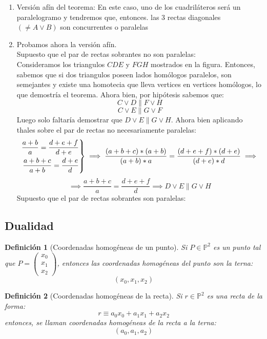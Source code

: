 \documentclass[11pt, a4paper]{article}
\makeatletter
\newif\IfInSansMode
\let\oldsf\sffamily
\renewcommand*{\sffamily}{\oldsf\mathversion{sans}\InSansModetrue}
\let\oldnorm\normalfont
\renewcommand*{\normalfont}{\oldnorm\InSansModefalse\mathversion{normal}}
\renewenvironment{proof}[1][\proofname] {\vspace{-15pt}\par\pushQED{\qed}\normalfont\topsep6\p@\@plus6\p@\relax\trivlist\item[\hskip\labelsep\it#1\@addpunct{.}]\ignorespaces}{\popQED\endtrivlist\@endpefalse}
\renewenvironment{proof}[1][\proofname] {\par\pushQED{\qed}\normalfont\topsep6\p@\@plus6\p@\relax\trivlist\item[\hskip\labelsep\itshape\sffamily#1\@addpunct{.}]\ignorespaces}{\popQED\endtrivlist\@endpefalse}
\theoremstyle{theorem-style}
\theoremstyle{definition-style}
\newtheorem{ndef}{Definición}[section]
\theoremstyle{remark-style}
\theoremstyle{example-style}
\newenvironment{nlist}
{\begin{enumerate}
    \renewcommand\labelenumi{(\emph{\roman{enumi})}}}
  {\end{enumerate}}
\newenvironment{rcases}
{\left.\begin{aligned}}
    {\end{aligned}\right\rbrace}
\makeatother
\begin{document}
\begin{proof} \hfill
	\begin{nlist}
	\item Versión afín del teorema: En este caso, uno de los cuadriláteros será un paralelogramo y tendremos que, entonces. las 3 rectas diagonales $(\ne A\vee B)$ son concurrentes o paralelas
	\item Probamos ahora la versión afín.\\
	Supuesto que el par de rectas sobrantes no son paralelas:\\
	Consideramos los triangulos $CDE$ y $FGH$ mostrados en la figura. Entonces, sabemos que si dos triangulos poseen lados homólogos paralelos, son semejantes y existe una homotecia que lleva vertices en vertices homólogos, lo que demostría el teorema.
	Ahora bien, por hipótesis sabemos que:
	$$C \vee D \parallel F \vee H$$
	$$C \vee E \parallel G \vee F$$
	Luego solo faltaría demostrar que $D \vee E \parallel G \vee H$. Ahora bien aplicando thales sobre el par de rectas no necesariamente paralelas:
	\[
	\begin{rcases}
		\frac{a+b}{a} = \frac{d+e+f}{d+e}\\
		\frac{a+b+c}{a+b} = \frac{d+e}{d}	
\end{rcases} \implies \frac{(a+b+c)*(a+b)}{(a+b)*a} = \frac{(d+e+f)*(d+e)}{(d+e)*d} \implies  
\]
$$\implies \frac{a+b+c}{a} = \frac{d+e+f}{d} \implies D \vee E \parallel G \vee H$$
Supuesto que el par de rectas sobrantes son paralelas:
\end{nlist}
\end{proof}

\subsection{Dualidad}

\begin{ndef}[Coordenadas homogéneas de un punto]
	Si $P \in \mathbb P^2$ es un punto tal que $P = \begin{pmatrix}
 x_0\\
 x_1\\
 x_2
\end{pmatrix}$, entonces las coordenadas homogéneas del punto son la terna:
\[
(x_0,x_1,x_2)
\]
\end{ndef}

\begin{ndef}[Coordenadas homogéneas de la recta]
	Si $r \in \mathbb P ^2$ es una recta de la forma:
	\[
	r \equiv a_0x_0 + a_1x_1 + a_2 x_2
	\]
	entonces, se llaman coordenadas homogéneas de la recta a la terna:
	\[
	(a_0,a_1,a_2)
	\]
\end{ndef}
\end{document}
